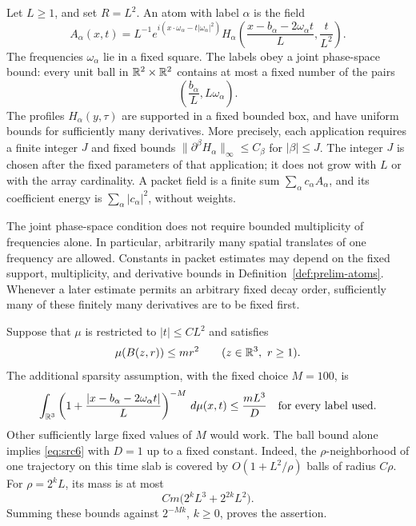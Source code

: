 \begin{definition}
\label{def:prelim-atoms}
Let $L\geq1$, and set $R=L^2$.  An atom with label $\alpha$ is the field
\begin{equation}
 A_\alpha(x,t)=L^{-1}
 e^{i(x\cdot\omega_\alpha-t|\omega_\alpha|^2)}
 H_\alpha\left(\frac{x-b_\alpha-2\omega_\alpha t}{L},
                  \frac{t}{L^2}\right).
 \label{eq:src5}
\end{equation}
The frequencies $\omega_\alpha$ lie in a fixed square.  The labels obey a
joint phase-space bound: every unit ball in $\mathbb R^2\times\mathbb R^2$ contains at most
a fixed number of the pairs
\[
 \left(\frac{b_\alpha}{L},L\omega_\alpha\right).
\]
The profiles $H_\alpha(y,\tau)$ are supported in a fixed bounded box, and
have uniform bounds for sufficiently many derivatives.  More precisely, each
application requires a finite integer $J$ and fixed bounds
$\|\partial^\beta H_\alpha\|_\infty\leq C_\beta$ for $|\beta|\leq J$.
The integer $J$ is chosen after the fixed parameters of that application; it
does not grow with $L$ or with the array cardinality.  A packet field is a finite
sum $\sum_\alpha c_\alpha A_\alpha$, and its coefficient energy is
$\sum_\alpha|c_\alpha|^2$, without weights.
\end{definition}

The joint phase-space condition does not require bounded multiplicity of
frequencies alone.  In particular, arbitrarily many spatial translates of one
frequency are allowed.  Constants in packet estimates may depend on the fixed
support, multiplicity, and derivative bounds in
Definition~\ref{def:prelim-atoms}.  Whenever a later estimate permits an
arbitrary fixed decay order, sufficiently many of these finitely many
derivatives are to be fixed first.

Suppose that $\mu$ is restricted to $|t|\leq C L^2$ and satisfies
\begin{equation}
 \mu(B(z,r))\leq m r^2 \qquad(z\in\mathbb R^3,\ r\geq1).
 \label{eq:prelim-ball-bound}
\end{equation}
The additional sparsity assumption, with the fixed choice $M=100$, is
\begin{equation}
 \int_{\mathbb R^3}
 \left(1+\frac{|x-b_\alpha-2\omega_\alpha t|}{L}\right)^{-M}
 \,d\mu(x,t)
 \leq\frac{mL^3}{D}
 \quad\text{for every label used.}
 \label{eq:src6}
\end{equation}
Other sufficiently large fixed values of $M$ would work.  The ball bound alone
implies \eqref{eq:src6} with $D=1$ up to a fixed constant.  Indeed, the
$\rho$-neighborhood of one trajectory on this time slab is covered by
$O(1+L^2/\rho)$ balls of radius $C\rho$.  For $\rho=2^kL$, its mass is at most
\[
 Cm\bigl(2^kL^3+2^{2k}L^2\bigr).
\]
Summing these bounds against $2^{-Mk}$, $k\geq0$, proves the assertion.

